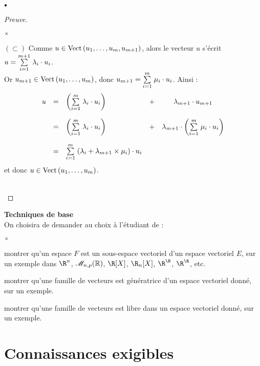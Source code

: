 \documentclass[11pt]{article}%
\begin{document}
\begin{noliste}{$\scriptstyle \bullet$}
\begin{proof}[Preuve]
\begin{noliste}{$\scriptstyle \times$}
  \item $(\subset)$ Comme $u\in {\rm{Vect}}\left(u_1,\hdots,u_m,u_{m+1}\right)$, alors 
  le 
  vecteur $u$ s'écrit $u={\textstyle\sum\limits_{i=1}^{m+1}}\hspace{.1cm} \lambda_i \cdot u_i$.\\
  Or $u_{m+1}\in{\rm{Vect}}\left(u_1,\hdots,u_m\right)$, donc $u_{m+1}={\textstyle\sum\limits_{i=1}^{m}}\hspace{.1cm} 
  \mu_i \cdot u_i$. Ainsi :
  \[
    \begin{array}{rclcc}
    u &=& \left({\textstyle\sum\limits_{i=1}^{m}}\hspace{.1cm} \lambda_i \cdot u_i\right) & + & 
    \lambda_{m+1} \cdot u_{m+1}
    \\[.6cm]
    &=& \left({\textstyle\sum\limits_{i=1}^{m}}\hspace{.1cm} \lambda_i \cdot u_i\right) & + & 
    \lambda_{m+1} \cdot \left( {\textstyle\sum\limits_{i=1}^{m}}\hspace{.1cm} \mu_i \cdot u_i\right)
    \\[.6cm]
    &=& {\textstyle\sum\limits_{i=1}^{m}}\hspace{.1cm} (\lambda_i+\lambda_{m+1} \times \mu_i) \cdot u_i
    \end{array}
  \]
  et donc $u\in{\rm{Vect}}\left(u_1,\hdots,u_m\right)$.
  \end{noliste}~\\[-1cm]
  \end{proof}
  
  
  \newpage
  
  
  \item {\bf Techniques de base}\\
  On choisira de demander au choix à l'étudiant de :
  \begin{noliste}{$\scriptstyle \times$}
    \item montrer qu'un espace $F$ est un sous-espace 
    vectoriel d'un espace vectoriel $E$, sur un exemple dans $\R^n$, 
    $\mathscr{M}_{n,p}(\mathbb{R})$, $\R[X]$, $\R_n[X]$, $\R^\N$, $\R^\R$, etc.
    \item montrer qu'une famille de vecteurs est génératrice d'un 
    espace vectoriel donné, sur un exemple.
    \item montrer qu'une famille de vecteurs est libre dans un 
    espace vectoriel donné, sur un exemple.
  \end{noliste}
\end{noliste}


\section*{Connaissances exigibles}
\end{document}
